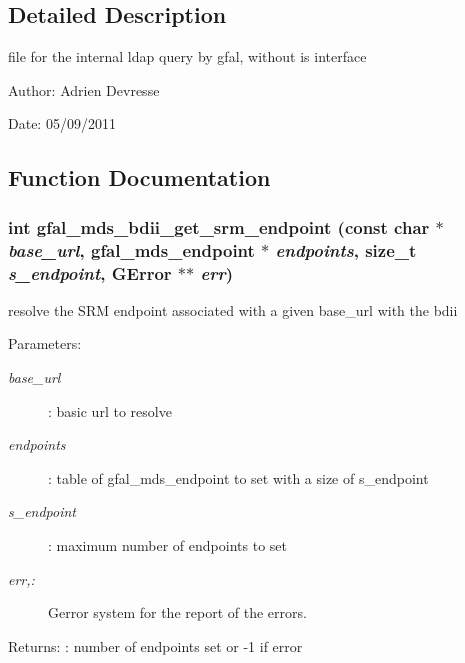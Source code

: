 \subsection{Detailed Description}
file for the internal ldap query by gfal, without is interface 

\begin{Desc}
\item[Author:]Adrien Devresse \end{Desc}
\begin{Desc}
\item[Date:]05/09/2011 \end{Desc}


\subsection{Function Documentation}
\subsubsection{\setlength{\rightskip}{0pt plus 5cm}int gfal\_\-mds\_\-bdii\_\-get\_\-srm\_\-endpoint (const char $\ast$ {\em base\_\-url}, gfal\_\-mds\_\-endpoint $\ast$ {\em endpoints}, size\_\-t {\em s\_\-endpoint}, GError $\ast$$\ast$ {\em err})}\label{gfal__common__mds__ldap__internal_8c_90e81f1cb8465df2bc1be169b9beb47e}


resolve the SRM endpoint associated with a given base\_\-url with the bdii \begin{Desc}
\item[Parameters:]
\begin{description}
\item[{\em base\_\-url}]: basic url to resolve \item[{\em endpoints}]: table of gfal\_\-mds\_\-endpoint to set with a size of s\_\-endpoint \item[{\em s\_\-endpoint}]: maximum number of endpoints to set \item[{\em err,:}]Gerror system for the report of the errors. \end{description}
\end{Desc}
\begin{Desc}
\item[Returns:]: number of endpoints set or -1 if error \end{Desc}
